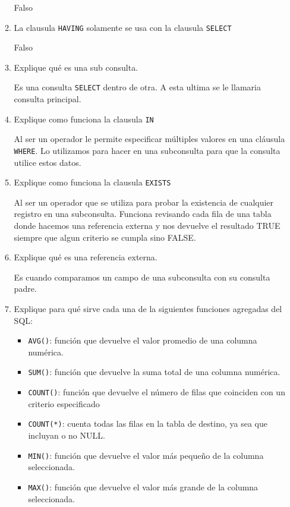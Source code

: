 \begin{enumerate}
\begin{enumerate}
Falso \\
\item La clausula \texttt{HAVING} solamente se usa con la clausula \texttt{SELECT}

Falso \\
\item Explique qué es una sub consulta.

Es una consulta \texttt{SELECT} dentro de otra. A esta ultima se le llamaria consulta principal.\\
\item Explique como funciona la clausula \texttt{IN}

Al ser un operador le permite especificar múltiples valores en una cláusula \texttt{WHERE}. Lo utilizamos para hacer en una subconsulta para que la consulta utilice estos datos.
\\
\item Explique como funciona la clausula \texttt{EXISTS}

Al ser un operador que se utiliza para probar la existencia de cualquier registro en una subconsulta. Funciona revisando cada fila de una tabla donde hacemos una referencia externa y nos devuelve el resultado TRUE siempre que algun criterio se cumpla sino FALSE.
\\
\item Explique qué es una referencia externa.

Es cuando comparamos un campo de una subconsulta con su consulta padre.\\
\item Explique para qué sirve cada una de la siguientes funciones agregadas del SQL:
\begin{itemize}
\item \texttt{AVG()}: función que devuelve el valor promedio de una columna numérica.
\item \texttt{SUM()}: función que devuelve la suma total de una columna numérica.
\item \texttt{COUNT()}: función que devuelve el número de filas que coinciden con un criterio especificado
\item \texttt{COUNT(*)}: cuenta todas las filas en la tabla de destino, ya sea que incluyan o no NULL.
\item \texttt{MIN()}: función que devuelve el valor más pequeño de la columna seleccionada.
\item \texttt{MAX()}: función que devuelve el valor más grande de la columna seleccionada.
\end{itemize}
\end{enumerate}

\end{enumerate}